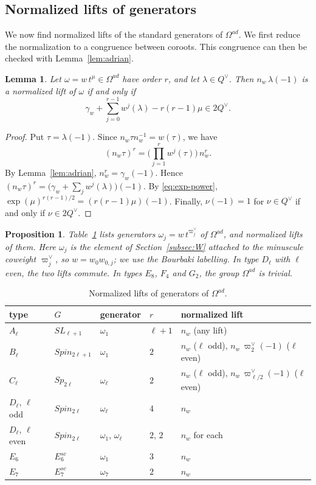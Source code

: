 \documentclass[psamsfonts]{amsart}
\newtheorem{prop}[thm]{Proposition}
\newtheorem{lem}[thm]{Lemma}
\theoremstyle{definition}
\theoremstyle{remark}
\numberwithin{equation}{section}
\numberwithin{equation}{section}
\newcommand{\om}{\omega}
\newcommand{\Om}{\Omega}
\theoremstyle{plain}
\begin{document}
\subsection{Normalized lifts of generators}
We now find normalized lifts of the standard generators of $\Om^{ad}$. We first reduce the normalization to a congruence between coroots. This congruence can then be checked with Lemma~\ref{lem:adrian}.

\begin{lem}\label{lem:criterion}
Let $\om=w\,t^{\mu}\in\Om^{ad}$ have order $r$, and let $\lambda\in Q^\vee$. Then $n_w\,\lambda(-1)$ is a normalized lift of $\om$ if and only if
\[
\gamma_w+\sum_{j=0}^{r-1}w^j(\lambda)-r(r-1)\mu\in2Q^\vee.
\]
\end{lem}

\begin{proof}
Put $\tau=\lambda(-1)$. Since $n_w\tau n_w^{-1}=w(\tau)$, we have
\[
(n_w\tau)^r=\Big(\prod_{j=1}^rw^j(\tau)\Big)\,n_w^r.
\]
By Lemma~\ref{lem:adrian}, $n_w^r=\gamma_w(-1)$. Hence $(n_w\tau)^r=\big(\gamma_w+\sum_jw^j(\lambda)\big)(-1)$. By \eqref{eq:exp-power}, $\exp(\mu)^{r(r-1)/2}=(r(r-1)\mu)(-1)$. Finally, $\nu(-1)=1$ for $\nu\in Q^\vee$ if and only if $\nu\in2Q^\vee$.
\end{proof}

\begin{prop}\label{prop:generators}
Table~\ref{tab:lifts} lists generators $\om_j=w\,t^{\varpi_j^\vee}$ of $\Om^{ad}$, and normalized lifts of them. Here $\om_j$ is the element of Section~\ref{subsec:W} attached to the minuscule coweight $\varpi_j^\vee$, so $w=w_0w_{0,j}$; we use the Bourbaki labelling. In type $D_\ell$ with $\ell$ even, the two lifts commute. In types $E_8$, $F_4$ and $G_2$, the group $\Om^{ad}$ is trivial.
\end{prop}

\begin{table}[ht]
\renewcommand{\arraystretch}{1.2}
\begin{tabular}{lllll}
type & $G$ & generator & $r$ & normalized lift\\ \hline
$A_\ell$ & $SL_{\ell+1}$ & $\om_1$ & $\ell+1$ & $n_w$ (any lift)\\
$B_\ell$ & $Spin_{2\ell+1}$ & $\om_1$ & $2$ & $n_w$ ($\ell$ odd), $n_w\,\varpi_2^\vee(-1)$ ($\ell$ even)\\
$C_\ell$ & $Sp_{2\ell}$ & $\om_\ell$ & $2$ & $n_w$ ($\ell$ odd), $n_w\,\varpi_{\ell/2}^\vee(-1)$ ($\ell$ even)\\
$D_\ell$, $\ell$ odd & $Spin_{2\ell}$ & $\om_\ell$ & $4$ & $n_w$\\
$D_\ell$, $\ell$ even & $Spin_{2\ell}$ & $\om_1$, $\om_\ell$ & $2$, $2$ & $n_{w}$ for each\\
$E_6$ & $E_6^{sc}$ & $\om_1$ & $3$ & $n_w$\\
$E_7$ & $E_7^{sc}$ & $\om_7$ & $2$ & $n_w$
\end{tabular}
\medskip
\caption{Normalized lifts of generators of $\Om^{ad}$.}\label{tab:lifts}
\end{table}
\end{document}
